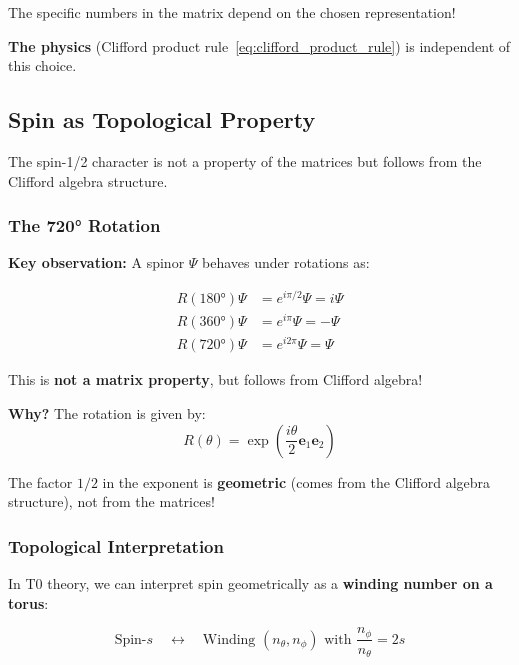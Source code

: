 The specific numbers in the matrix depend on the chosen representation!

\textbf{The physics} (Clifford product rule~\eqref{eq:clifford_product_rule}) is independent of this choice.

\subsection{Spin as Topological Property}
\label{subsec:spin_topology_detailed}

The spin-1/2 character is not a property of the matrices but follows from the Clifford algebra structure.

\subsubsection{The 720° Rotation}

\textbf{Key observation:} A spinor $\Psi$ behaves under rotations as:

\begin{align}
	R(180°) \Psi &= e^{i\pi/2} \Psi = i \Psi \\
	R(360°) \Psi &= e^{i\pi} \Psi = -\Psi \\
	R(720°) \Psi &= e^{i 2\pi} \Psi = \Psi
\end{align}

This is \textbf{not a matrix property}, but follows from Clifford algebra!

\textbf{Why?} The rotation is given by:
\begin{equation}
	R(\theta) = \exp\left(\frac{i\theta}{2} \mathbf{e}_1 \mathbf{e}_2\right)
\end{equation}

The factor $1/2$ in the exponent is \textbf{geometric} (comes from the Clifford algebra structure), not from the matrices!

\subsubsection{Topological Interpretation}

In T0 theory, we can interpret spin geometrically as a \textbf{winding number on a torus}:

\begin{equation}
	\text{Spin-}s \quad \longleftrightarrow \quad \text{Winding } (n_\theta, n_\phi) 
	\text{ with } \frac{n_\phi}{n_\theta} = 2s
	\label{eq:spin_winding_number}
\end{equation}

